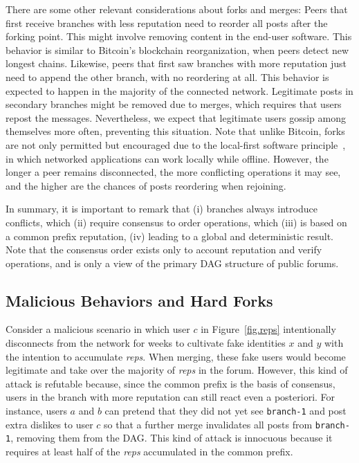 \documentclass[12pt]{article}
\newcommand{\reps}     {\emph{reps}\xspace}
\newcommand{\code}[1]  {\texttt{\footnotesize{#1}}}
\begin{document}
There are some other relevant considerations about forks and merges:
%
Peers that first receive branches with less reputation need to reorder all
posts after the forking point.
This might involve removing content in the end-user software.
This behavior is similar to Bitcoin's blockchain reorganization, when peers
detect new longest chains. %
%
Likewise, peers that first saw branches with more reputation just need to
append the other branch, with no reordering at all.
This behavior is expected to happen in the majority of the connected network.
%
Legitimate posts in secondary branches might be removed due to merges, which
requires that users repost the messages.
Nevertheless, we expect that legitimate users gossip among themselves more
often, preventing this situation.
%
Note that unlike Bitcoin, forks are not only permitted but encouraged due to
the local-first software principle~\cite{p2p.local}, in which networked
applications can work locally while offline.
However, the longer a peer remains disconnected, the more conflicting
operations it may see, and the higher are the chances of posts reordering when
rejoining.

In summary, it is important to remark that
    (i) branches always introduce conflicts, which
    (ii) require consensus to order operations, which
    (iii) is based on a common prefix reputation,
    (iv) leading to a global and deterministic result.
%
Note that the consensus order exists only to account reputation and verify
operations, and is only a view of the primary DAG structure of public forums.

\subsection{Malicious Behaviors and Hard Forks}
\label{sec.design.hard}

Consider a malicious scenario in which user $c$ in Figure~\ref{fig.reps}
intentionally disconnects from the network for weeks to cultivate fake
identities $x$ and $y$ with the intention to accumulate \reps.
When merging, these fake users would become legitimate and take over the
majority of \reps in the forum.
%
However, this kind of attack is refutable because, since the common prefix is
the basis of consensus, users in the branch with more reputation can still
react even a posteriori.
For instance, users $a$ and $b$ can pretend that they did not yet see
\code{branch-1} and post extra dislikes to user $c$ so that a further merge
invalidates all posts from \code{branch-1}, removing them from the DAG.
%
This kind of attack is innocuous because it requires at least half of the \reps
accumulated in the common prefix.
%
\end{document}
